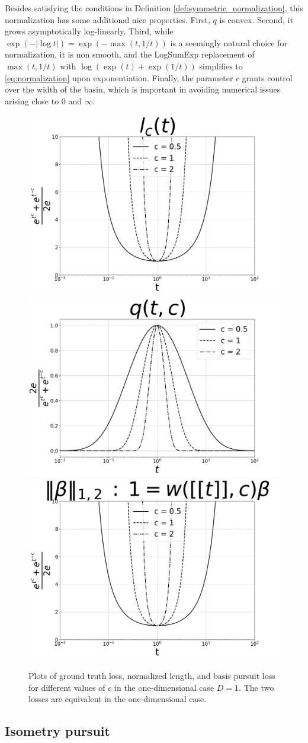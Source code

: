 Besides satisfying the conditions in Definition \ref{def:symmetric_normalization}, this normalization has some additional nice properties.
First, $q$ is convex.
Second, it grows asymptotically log-linearly.
Third, while $\exp(-|\log t|) = \exp(-\max (t, 1/t))$ is a seemingly natural choice for normalization, it is non smooth, and the LogSumExp \citep{Boyd2004-ql} replacement of $\max (t, 1/t)$ with $ \log (\exp (t ) + \exp(1/t))$ simplifies to \ref{eq:normalization} upon exponentiation.
Finally, the parameter $c$ grants control over the width of the basin, which is important in avoiding numerical issues arising close to $0$ and $\infty$.

\begin{figure}
\centering
{}
{\includegraphics[width = .32\textwidth]{../figures/Figure_1a_bw.png}}
\label{fig:gt_loss}
{\includegraphics[width = .32\textwidth]{../figures/Figure_1b_bw.png}}
{\includegraphics[width = .32\textwidth]{../figures/Figure_1c_bw.png}}
\caption{Plots of ground truth loss, normalized length, and basis pursuit loss for different values of $c$ in the one-dimensional case $D = 1$.
The two losses are equivalent in the one-dimensional case.}
\label{fig:losses}
\end{figure}

\subsection{Isometry pursuit}

